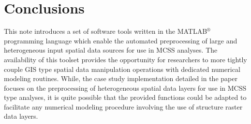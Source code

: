 \section{Conclusions}

    This note introduces a set of software tools written in the MATLAB$^{\circledR}$ programming language which enable the automated preprocessing of large and heterogeneous input spatial data sources for use in MCSS analyses. The availability of this toolset provides the opportunity for researchers to more tightly couple GIS type spatial data manipulation operations with dedicated numerical modeling routines. While, the case study implementation detailed in the paper focuses on the preprocessing of heterogeneous spatial data layers for use in MCSS type analyses, it is quite possible that the provided functions could be adapted to facilitate any numerical modeling procedure involving the use of structure raster data layers.
    